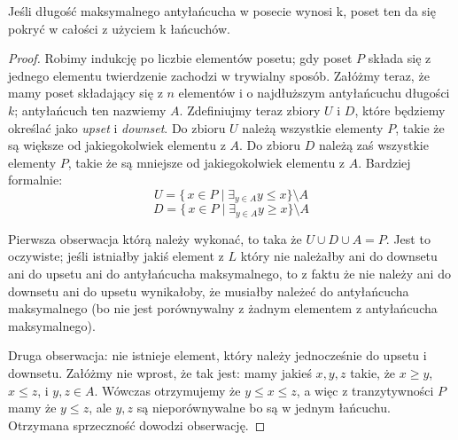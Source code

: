 \begin{theorem}
	Jeśli długość maksymalnego antyłańcucha w posecie wynosi k, poset ten da się pokryć w całości z użyciem k łańcuchów.
\end{theorem}

\begin{proof}
	Robimy indukcję po liczbie elementów posetu; gdy poset $P$ składa się z jednego elementu twierdzenie zachodzi w trywialny sposób. Załóżmy teraz, że mamy poset składający się z $n$ elementów i o najdłuższym antyłańcuchu długości $k$; antyłańcuch ten nazwiemy $A$. Zdefiniujmy teraz zbiory $U$ i $D$, które będziemy określać jako \textit{upset} i \textit{downset}. Do zbioru $U$ należą wszystkie elementy $P$, takie że są większe od jakiegokolwiek elementu z $A$. Do zbioru $D$ należą zaś wszystkie elementy $P$, takie że są mniejsze od jakiegokolwiek elementu z $A$. Bardziej formalnie:
	\begin{equation*}
		U = \{\,x \in P \mid \exists_{y \in A}  y \leq x \} \setminus A
	\end{equation*}
	\begin{equation*}
		D = \{\,x \in P \mid \exists_{y \in A} y \geq x \} \setminus A
	\end{equation*}

	Pierwsza obserwacja którą należy wykonać, to taka że $U \cup D \cup A = P$. Jest to oczywiste; jeśli istniałby jakiś element z $L$ który nie należałby ani do downsetu ani do upsetu ani do antyłańcucha maksymalnego, to z faktu że nie należy ani do downsetu ani do upsetu wynikałoby, że musiałby należeć do antyłańcucha maksymalnego (bo nie jest porównywalny z żadnym elementem z antyłańcucha maksymalnego).

	Druga obserwacja: nie istnieje element, który należy jednocześnie do upsetu i downsetu. Załóżmy nie wprost, że tak jest: mamy jakieś $x, y, z$ takie, że $x \geq y$,  $x \leq z$, i $y,z \in A$. Wówczas otrzymujemy że $y \leq x \leq z$, a więc z tranzytywności $P$ mamy że $y \leq z$, ale $y, z$ są nieporównywalne bo są w jednym łańcuchu. Otrzymana sprzeczność dowodzi obserwację.


\end{proof}
